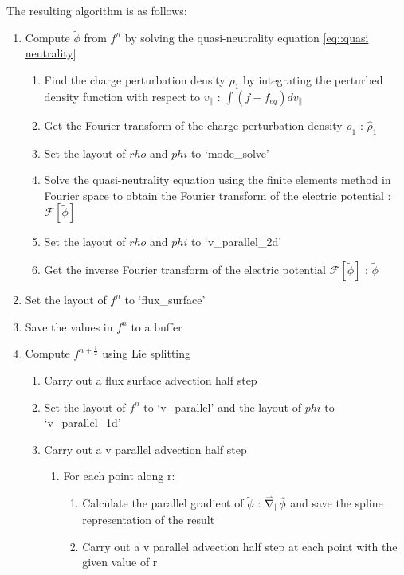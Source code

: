 The resulting algorithm is as follows:

\begin{enumerate}
 \item Compute $\tilde{\phi}$ from $f^n$ by solving the quasi-neutrality equation \ref{eq::quasi neutrality} \label{get phi}
 \begin{enumerate}
  \item Find the charge perturbation density $\rho_1$ by integrating the perturbed density function with respect to $v_\parallel$ : $\int (f-f_{eq}) dv_\parallel$
  \item Get the Fourier transform of the charge perturbation density $\rho_1$ : $\hat{\rho}_1$
  \item Set the layout of $rho$ and $phi$ to `mode\_solve'
  \item Solve the quasi-neutrality equation using the finite elements method in Fourier space to obtain the Fourier transform of the electric potential : $\mathcal{F}\left[\tilde{\phi}\right]$
  \item Set the layout of $rho$ and $phi$ to `v\_parallel\_2d'
  \item Get the inverse Fourier transform of the electric potential $\mathcal{F}\left[\tilde{\phi}\right]$ : $\tilde{\phi}$
 \end{enumerate}
 \item Set the layout of $f^n$ to `flux\_surface'
 \item Save the values in $f^n$ to a buffer
 \item Compute $f^{n+\frac{1}{2}}$ using Lie splitting
 \begin{enumerate}
  \item Carry out a flux surface advection half step
  \item Set the layout of $f^n$ to `v\_parallel' and the layout of $phi$ to `v\_parallel\_1d'
  \item Carry out a v parallel advection half step \label{v parallel step}
   \begin{enumerate}
    \item For each point along r:
    \begin{enumerate}
    \item Calculate the parallel gradient of $\tilde{\phi}$ : $\accentset{\rightharpoonup}{\nabla}_\parallel \tilde{\phi}$ and save the spline representation of the result
    \item Carry out a v parallel advection half step at each point with the given value of r
   \end{enumerate}
   \end{enumerate}

\end{enumerate}
\end{enumerate}
